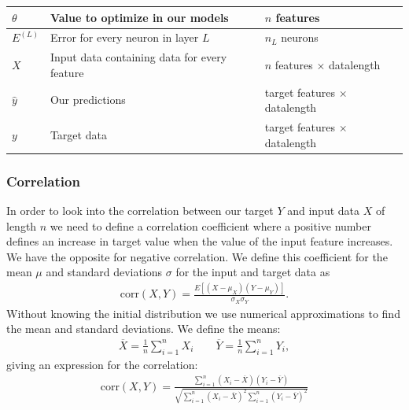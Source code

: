 \documentclass[11pt]{article}
\begin{document}
\begin{table}[H]
\begin{small}
\begin{center}
\begin{tabular}{|l|l|l|}
                \hline
                $\theta$       & Value to optimize in our models                           & $n$ features                        \\
                \hline
                ${E}^{(L)}$    & Error for every neuron in layer $L$                       & $n_{L}$ neurons                     \\
                \hline
                $X$            & Input data containing data for every feature              & $n$ features $\times$ datalength    \\
                \hline
                $\hat{y}$      & Our predictions                                           & target features $\times$ datalength \\
                \hline
                $y$            & Target data                                               & target features $\times$ datalength \\
                \hline
            \end{tabular}
        \end{center}
    \end{small}
\end{table}
\subsubsection*{Correlation}
In order to look into the correlation between our target $Y$ and input data $X$ of length $n$ we need to define a correlation coefficient where a positive number defines an increase in target value when the value of the input feature increases. We have the opposite for negative correlation. We define this coefficient for the mean $\mu$ and standard deviations $\sigma$ for the input and target data as
\begin{align*}
    \text{corr}(X, Y) = \frac{E[(X- \mu_X)(Y-\mu_Y)]}{\sigma_X\sigma_Y}.
\end{align*}
Without knowing the initial distribution we use numerical approximations to find the mean and standard deviations. We define the means:
\begin{align*}
    \overline{X} = \frac{1}{n}\sum_{i=1}^n X_i \quad\quad \overline{Y} = \frac{1}{n}\sum_{i=1}^n Y_i,
\end{align*}
giving an expression for the correlation:
\begin{align*}
    \text{corr}(X, Y) = \frac{\sum_{i=1}^n (X_i- \overline{X})(Y_i- \overline{Y})}{\sqrt{\sum_{i=1}^n (X_i- \overline{X})^2 \sum_{i=1}^n (Y_i- \overline{Y})^2}}
\end{align*}
\end{document}
